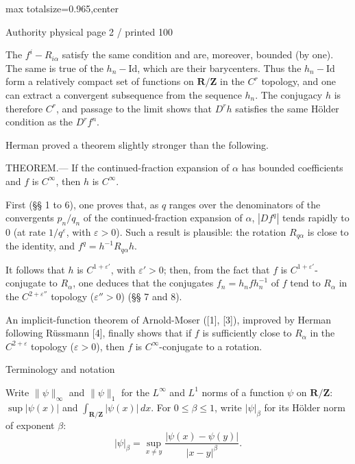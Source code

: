 \documentclass{article}
\begin{document}
\newpage
\noindent\begin{adjustbox}{max totalsize={\textwidth}{0.965\textheight},center}\begin{minipage}{\textwidth}
\noindent\hfill\scriptsize Authority physical page 2 / printed 100\par\normalsize
The \(f^i-R_{i\alpha}\) satisfy the same condition and are, moreover, bounded (by one). The same is true of the \(h_n-\mathrm{Id}\), which are their barycenters. Thus the \(h_n-\mathrm{Id}\) form a relatively compact set of functions on \(\mathbf R/\mathbf Z\) in the \(C^r\) topology, and one can extract a convergent subsequence from the sequence \(h_n\). The conjugacy \(h\) is therefore \(C^r\), and passage to the limit shows that \(D^rh\) satisfies the same Hölder condition as the \(D^rf^n\).

Herman proved a theorem slightly stronger than the following.

THEOREM.— If the continued-fraction expansion of \(\alpha\) has bounded coefficients and \(f\) is \(C^\infty\), then \(h\) is \(C^\infty\).

First (§§ 1 to 6), one proves that, as \(q\) ranges over the denominators of the convergents \(p_n/q_n\) of the continued-fraction expansion of \(\alpha\), \(|Df^q|\) tends rapidly to \(0\) (at rate \(1/q^\varepsilon\), with \(\varepsilon>0\)). Such a result is plausible: the rotation \(R_{q\alpha}\) is close to the identity, and \(f^q=h^{-1}R_{q\alpha}h\).

It follows that \(h\) is \(C^{1+\varepsilon'}\), with \(\varepsilon'>0\); then, from the fact that \(f\) is \(C^{1+\varepsilon'}\)-conjugate to \(R_\alpha\), one deduces that the conjugates \(f_n=h_nfh_n^{-1}\) of \(f\) tend to \(R_\alpha\) in the \(C^{2+\varepsilon''}\) topology (\(\varepsilon''>0\)) (§§ 7 and 8).

An implicit-function theorem of Arnold-Moser ([1], [3]), improved by Herman following Rüssmann [4], finally shows that if \(f\) is sufficiently close to \(R_\alpha\) in the \(C^{2+\varepsilon}\) topology (\(\varepsilon>0\)), then \(f\) is \(C^\infty\)-conjugate to a rotation.

Terminology and notation

Write \(\|\psi\|_\infty\) and \(\|\psi\|_1\) for the \(L^\infty\) and \(L^1\) norms of a function \(\psi\) on \(\mathbf R/\mathbf Z\): \(\sup|\psi(x)|\) and \(\int_{\mathbf R/\mathbf Z}|\psi(x)|\,dx\). For \(0\leq\beta\leq1\), write \(|\psi|_\beta\) for its Hölder norm of exponent \(\beta\):
\[
|\psi|_\beta=\sup_{x\neq y}\frac{|\psi(x)-\psi(y)|}{|x-y|^\beta}.
\]
\end{minipage}\end{adjustbox}
\end{document}
